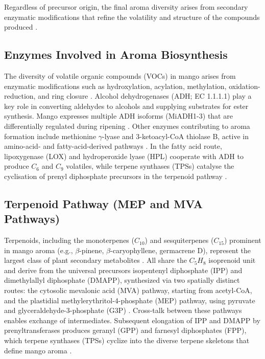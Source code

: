\vspace{1em}
Regardless of precursor origin, the final aroma diversity arises from secondary enzymatic modifications that refine the volatility and structure of the compounds produced \cite*{A13_ElHadi2013}.

\subsection{Enzymes Involved in Aroma Biosynthesis}
The diversity of volatile organic compounds (VOCs) in mango arises from enzymatic modifications such as hydroxylation, acylation, methylation, oxidation-reduction, and ring closure \cite*{A13_ElHadi2013}. Alcohol dehydrogenases (ADH; EC 1.1.1.1) play a key role in converting aldehydes to alcohols and supplying substrates for ester synthesis. Mango expresses multiple ADH isoforms (MiADH1-3) that are differentially regulated during ripening \cite*{A10_Singh2010}. Other enzymes contributing to aroma formation include methionine $\gamma$-lyase and 3-ketoacyl-CoA thiolase B, active in amino-acid- and fatty-acid-derived pathways \cite*{A05_Chin2019}. In the fatty acid route, lipoxygenase (LOX) and hydroperoxide lyase (HPL) cooperate with ADH to produce $C_6$ and $C_9$ volatiles, while terpene synthases (TPSs) catalyse the cyclisation of prenyl diphosphate precursors in the terpenoid pathway \cite*{A13_ElHadi2013}.

\subsection{Terpenoid Pathway (MEP and MVA Pathways)}
Terpenoids, including the monoterpenes ($C_{10}$) and sesquiterpenes ($C_{15}$) prominent in mango aroma (e.g., $\beta$-pinene, $\beta$-caryophyllene, germacrene D), represent the largest class of plant secondary metabolites \cite*{A02_Moreno2010,A04_GUO2023112779,A09_Barras2024,A13_ElHadi2013}. All share the $C_{5}H_{8}$ isoprenoid unit and derive from the universal precursors isopentenyl diphosphate (IPP) and dimethylallyl diphosphate (DMAPP), synthesized via two spatially distinct routes: the cytosolic mevalonic acid (MVA) pathway, starting from acetyl-CoA, and the plastidial methylerythritol-4-phosphate (MEP) pathway, using pyruvate and glyceraldehyde-3-phosphate (G3P) \cite*{A09_Barras2024,A13_ElHadi2013}. Cross-talk between these pathways enables exchange of intermediates. Subsequent elongation of IPP and DMAPP by prenyltransferases produces geranyl (GPP) and farnesyl diphosphates (FPP), which terpene synthases (TPSs) cyclize into the diverse terpene skeletons that define mango aroma \cite*{B01_TerpenesTerpenoids_2018,A13_ElHadi2013}.


